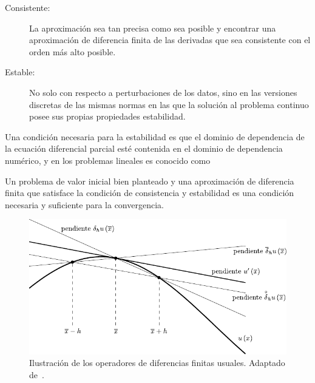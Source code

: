 \begin{description}
    \item[Consistente:]

        La aproximación sea tan precisa como sea posible y encontrar
        una aproximación de diferencia finita de las derivadas que
        sea consistente con el orden más alto posible.

    \item[Estable:]

        No solo con respecto a perturbaciones de los datos, sino
        en las versiones discretas de las mismas normas en las que la
        solución al problema continuo posee sus propias propiedades
        estabilidad.
\end{description}

Una condición necesaria para la estabilidad es que el dominio de
dependencia de la ecuación diferencial parcial esté contenida en el
dominio de dependencia numérico, y en los problemas lineales es
conocido como

\begin{theorem}
    Un problema de valor inicial bien planteado y una aproximación de
    diferencia finita que satisface la condición de consistencia y
    estabilidad es una condición necesaria y suficiente para la
    convergencia.
\end{theorem}

\begin{figure}[ht!]
    \centering
    \includegraphics[width=.5\paperwidth]{E_IMAGENES/1_Capitulo2/finite_difference.pdf}
    \caption{
        Ilustración de los operadores de diferencias finitas usuales.
        Adaptado de~\citep{leveque_numerical_1992}.
    }
\end{figure}

